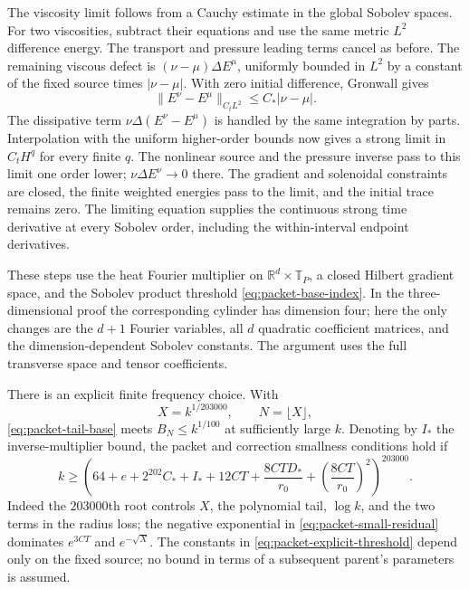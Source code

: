 \documentclass[11pt]{article}
\newcommand{\R}{\mathbb R}
\theoremstyle{definition}
\begin{document}
The viscosity limit follows from a Cauchy estimate in the global
Sobolev spaces. For two viscosities, subtract their equations and use the
same metric $L^2$ difference energy. The transport and pressure leading
terms cancel as before. The remaining viscous defect is
$(\nu-\mu)\Delta E^\mu$, uniformly bounded in $L^2$ by a constant
of the fixed source times $|\nu-\mu|$. With zero initial difference,
Gronwall gives
\[
 \|E^\nu-E^\mu\|_{C_tL^2}\le C_*|\nu-\mu|.
\]
The dissipative term $\nu\Delta(E^\nu-E^\mu)$ is handled by the same
integration by parts. Interpolation with the uniform higher-order
bounds now gives a strong limit in $C_tH^q$ for every finite $q$.
The nonlinear source and the pressure inverse pass to this limit
one order lower; $\nu\Delta E^\nu\to0$ there. The gradient and
solenoidal constraints are closed, the finite weighted energies pass to
the limit, and the initial trace remains zero. The limiting equation
supplies the continuous strong time derivative at every Sobolev order,
including the within-interval endpoint derivatives.

These steps use the heat Fourier multiplier on
$\R^d\times\mathbb T_P$, a closed Hilbert gradient space, and the
Sobolev product threshold \eqref{eq:packet-base-index}. In the
three-dimensional proof the corresponding cylinder has dimension four;
here the only changes are the $d+1$ Fourier variables, all $d$ quadratic
coefficient matrices, and the dimension-dependent Sobolev constants.
The argument uses the full transverse space and tensor coefficients.

There is an explicit finite frequency choice. With
\[
 X=k^{1/203000},\qquad N=\lfloor X\rfloor,
\]
\eqref{eq:packet-tail-base} meets $B_N\le k^{1/100}$ at sufficiently
large $k$. Denoting by $I_*$ the inverse-multiplier
bound, the packet and correction smallness conditions hold if
\begin{equation}\label{eq:packet-explicit-threshold}
 k\ge\left(64+e+2^{202}C_*+I_*+12CT
       +\frac{8CTD_*}{r_0}
       +\left(\frac{8CT}{r_0}\right)^2\right)^{203000}.
\end{equation}
Indeed the $203000$th root controls $X$, the polynomial tail, $\log k$,
and the two terms in the radius loss; the negative exponential in
\eqref{eq:packet-small-residual} dominates $e^{3CT}$ and
$e^{-\sqrt X}$. The constants in \eqref{eq:packet-explicit-threshold}
depend only on the fixed source; no bound in terms of a subsequent
parent's parameters is assumed.
\end{document}
